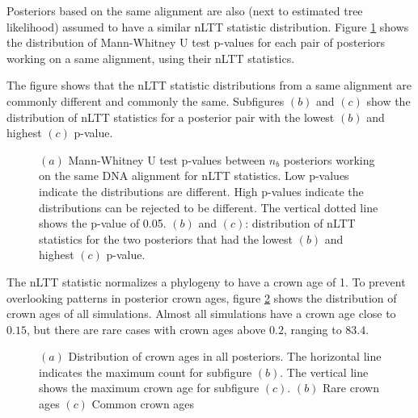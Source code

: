 Posteriors based on the same alignment are also (next to estimated tree likelihood) 
assumed to have a similar nLTT statistic distribution. 
Figure \ref{fig:figure_posterior_distribution_nltt} 
shows the distribution of Mann-Whitney U test p-values for each pair of 
posteriors working on a same alignment, 
using their nLTT statistics.

The figure shows that the nLTT statistic distributions 
from a same alignment are commonly different and commonly the same. 
Subfigures $(b)$ and $(c)$ show the distribution of
nLTT statistics for a posterior pair with the lowest $(b)$ and 
highest $(c)$ p-value.

\begin{figure}[!htbp]
  \caption{
    $(a)$ Mann-Whitney U test p-values between $n_b$ posteriors working on the same DNA alignment
    for nLTT statistics.
    Low p-values indicate the distributions are different.
    High p-values indicate the distributions can be rejected to be different.
    The vertical dotted line shows the p-value of 0.05.
    $(b)$ and $(c)$: distribution of nLTT statistics for the two posteriors that had the lowest
    $(b)$ and highest $(c)$ p-value.
  }
  \label{fig:figure_posterior_distribution_nltt}
\end{figure}

The nLTT statistic normalizes a phylogeny to have a crown age of 1.
To prevent overlooking patterns in posterior crown ages, 
figure \ref{fig:figure_posterior_distribution_crown_ages}
shows the distribution of crown ages of all simulations.
Almost all simulations have a crown age close to $0.15$, but there
are rare cases with crown ages above $0.2$, ranging to $83.4$.


\begin{figure}[!htbp]
  \caption{
    $(a)$ Distribution of crown ages in all posteriors. 
    The horizontal line indicates the maximum count for subfigure $(b)$. 
    The vertical line shows the maximum crown age for subfigure $(c)$.
    $(b)$ Rare crown ages
    $(c)$ Common crown ages
  }
  \label{fig:figure_posterior_distribution_crown_ages}
\end{figure}

